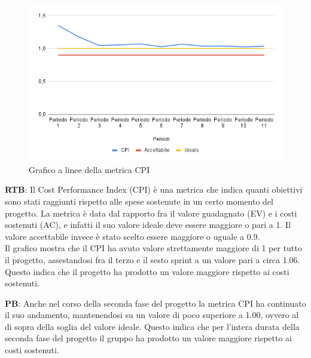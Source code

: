 \documentclass[10pt]{article}
\begin{document}
\begin{justify}
\begin{figure}[H]
  \centering
  \includegraphics[width=0.9\linewidth]{CPI.png}
  \caption{Grafico a linee della metrica CPI}
  \label{fig:CPIchart}
\end{figure}

\textbf{RTB}: Il Cost Performance Index (CPI) è una metrica che indica quanti obiettivi sono stati raggiunti rispetto alle spese sostenute in un certo momento del
progetto. La metrica è data dal rapporto fra il valore guadagnato (EV) e i costi sostenuti (AC), e infatti il suo valore ideale deve essere maggiore o pari a 1.
Il valore accettabile invece è stato scelto essere maggiore o uguale a 0.9.\\
Il grafico mostra che il CPI ha avuto valore strettamente maggiore di 1 per tutto il progetto, assestandosi fra il terzo e il sesto sprint a un valore pari a circa 1.06.
Questo indica che il progetto ha prodotto un valore maggiore rispetto ai costi sostenuti.

\noindent
\textbf{PB}: Anche nel corso della seconda fase del progetto la metrica CPI ha continuato il suo andamento, mantenendosi su un valore di poco superiore a 1.00, ovvero 
al di sopra della soglia del valore ideale. Questo indica che per l'intera durata della seconda fase del progetto il gruppo ha prodotto un valore maggiore rispetto ai 
costi sostenuti.\\



\end{justify}
\end{document}
